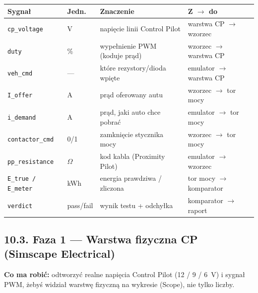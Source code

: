 \documentclass[11pt]{article}
\newcommand{\ra}{$\rightarrow$}
\newcommand{\key}[1]{\textbf{\color{navy}#1}}
\begin{document}
\begin{center}
\begin{tabularx}{\linewidth}{@{}l l X l@{}}
\toprule
\textbf{Sygnał} & \textbf{Jedn.} & \textbf{Znaczenie} & \textbf{Z \ra{} do} \\
\midrule
\texttt{cp\_voltage} & V & napięcie linii Control Pilot & warstwa CP \ra{} wzorzec \\
\texttt{duty} & \% & wypełnienie PWM (koduje prąd) & wzorzec \ra{} warstwa CP \\
\texttt{veh\_cmd} & --- & które rezystory/dioda wpięte & emulator \ra{} warstwa CP \\
\texttt{I\_offer} & A & prąd oferowany autu & wzorzec \ra{} tor mocy \\
\texttt{i\_demand} & A & prąd, jaki auto chce pobrać & emulator \ra{} tor mocy \\
\texttt{contactor\_cmd} & 0/1 & zamknięcie stycznika mocy & wzorzec \ra{} tor mocy \\
\texttt{pp\_resistance} & $\Omega$ & kod kabla (Proximity Pilot) & emulator \ra{} wzorzec \\
\texttt{E\_true / E\_meter} & kWh & energia prawdziwa / zliczona & tor mocy \ra{} komparator \\
\texttt{verdict} & pass/fail & wynik testu + odchyłka & komparator \ra{} raport \\
\bottomrule
\end{tabularx}
\end{center}

\subsection{10.3. Faza 1 --- Warstwa fizyczna CP (Simscape Electrical)}

\key{Co ma robić:} odtworzyć realne napięcia Control Pilot (12 / 9 / 6~V) i sygnał PWM, żebyś widział warstwę fizyczną na wykresie (Scope), nie tylko liczby.
\end{document}
